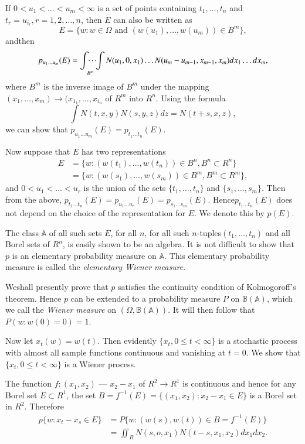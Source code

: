 If $0 < u_1 < \ldots < u_m < \infty$ is a set of points containing
$t_1, \ldots,t_n$ and $t_r = u_{i_r}, r = 1, 2, \ldots,n$, then $E$
can also be written as  
$$
  E= \bigg\{ w: w \in \Omega \text{ and } (w(u_1), \ldots, w (u_m)) \in
  B^m \bigg\},
$$
and\pageoriginale then
$$
p_{u_{1} \ldots u_m} (E) = \idotsint\limits_{B^m} N(u_1, 0, x_1)
  \ldots N(u_m - u_{m-1}, x_{m-1}, x_m) dx_1 \ldots dx_m,
$$
where $B^m$ is the inverse image of $B^m$ under the mapping $(x_1,
\ldots, x_m) \to (x_{1_1}, \ldots, x_{i_{n}}$ of $R^m$ into
$R^n$. Using the formula  
$$
\int N(t,x,y) N(s,y,z)dz = N(t + s, x, z),
$$
we can show that $p_{{u{_1}} \ldots u_m}(E) = p_{{t{_1}} \ldots t_n}(E)$.

Now suppose that $E$ has two representations 
\begin{align*}
E & = \bigg\{ w: (w(t_1) , \ldots , w(t_n)) \in B^n, B^n \subset R^n \bigg\}\\
  & = \bigg\{ w: (w(s_1) , \ldots , w(s_m)) \in B^m, B^m \subset R^m \bigg\},
\end{align*}
and $0 < u_1 < \ldots < u_r$ is the union of the sets $\{ t_1, \ldots,
t_n \}$ and $\{ s_1, \ldots , s_m \}$. Then from the above,
$p_{t_{1} \ldots t_n}(E)= p_{{u{_1}} \ldots u_r}(E)= p_{{s{_1}}
  \ldots s_m}(E)$. Hence\break $p_{{t{_1}} \ldots t_n}(E)$ does not depend
on the choice of the representation for $E$. We denote this by
$p(E)$.

The class $\mathbb{A}$ of all such sets $E$, for all $n$, for all such
$n$-tuples\break $(t_1, \ldots, t_n)$ and all Borel sets of $R^n$, is easily
shown to be an algebra. It is not difficult to show that $p$ is an
elementary probability measure on $\mathbb{A}$. This elementary
probability measure is called the \textit{elementary Wiener
  measure}.

We\pageoriginale shall presently prove that $p$ satisfies the
continuity condition 
of Kolmogoroff's theorem. Hence $p$ can be extended to a probability
measure $P$ on $\mathbb{B}(\mathbb{A})$, which we call the 
\textit{Wiener measure} on $(\Omega, \mathbb{B} (\mathbb{A}))$. It will
then follow that $P(w : w(0) = 0)=1$.  

Now let $x_t(w) = w(t)$. Then evidently $\{ x_t, 0 \leq t  < \infty
\}$ is a stochastic process with almost all sample functions
continuous and vanishing at $t = 0$. We show that $\{ x_t, 0 \leq t  <
\infty \}$ is a Wiener process. 

The function $f: (x_1 , x_2)$ --- $x_2 - x_1$ of $R^2 \to R^1$ is
continuous and hence for any Borel set $E \subset R^1$, the set $B =
f^{-1}(E) = \{ (x_1, x_2) : x_2 - x_1 \in E \}$ is a Borel set in
$R^2$. Therefore  
\begin{align*}
  p\{ w: x_t - x_s \in E \} & = P\{ w : (w(s), w(t)) \in B = f^{-1}(E) \}\\
  & = \iint_B  N(s, o, x_1) N(t-s, x_1, x_2) dx_1 dx_2.
\end{align*}

